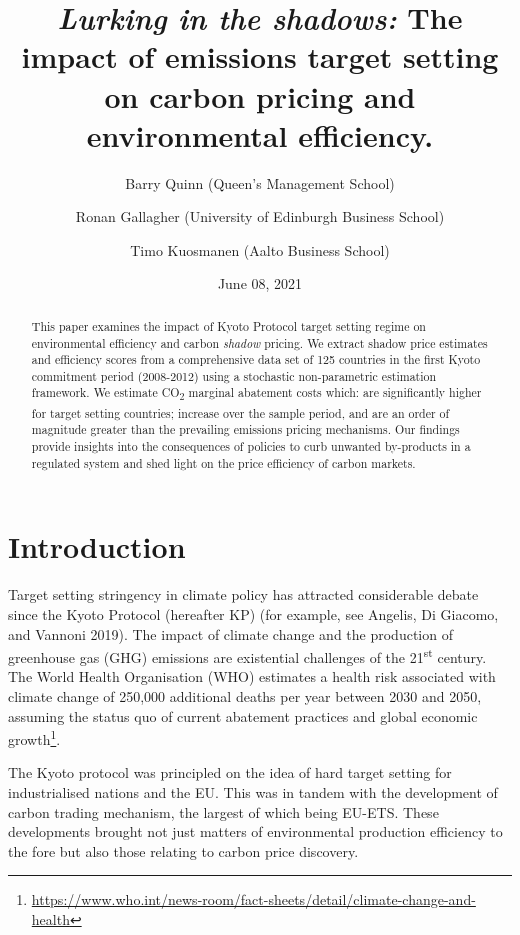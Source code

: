 \documentclass[
  10pt,
]{article}
\title{\emph{Lurking in the shadows:} The impact of emissions target setting on
carbon pricing and environmental efficiency.}
\author{Barry Quinn (Queen's Management School) \and Ronan Gallagher (University of Edinburgh Business School) \and Timo Kuosmanen (Aalto Business School)}
\date{June 08, 2021}
\begin{document}
\maketitle
\begin{abstract}
This paper examines the impact of Kyoto Protocol target setting
regime on environmental efficiency and carbon \emph{shadow} pricing. We
extract shadow price estimates and efficiency scores from a
comprehensive data set of 125 countries in the first Kyoto commitment period (2008-2012) using
a stochastic non-parametric estimation framework. We estimate CO\textsubscript{2}
marginal abatement costs which: are significantly higher for target setting countries; increase over the sample period, and are an order of magnitude greater
than the prevailing emissions pricing mechanisms. Our findings provide insights into the consequences of policies to curb unwanted by-products in a regulated
system and shed light on the price efficiency of carbon markets.
\end{abstract}

\hypertarget{introduction}{%
\section{Introduction}\label{introduction}}

Target setting stringency in climate policy has attracted considerable
debate since the Kyoto Protocol (hereafter KP) (for example, see
Angelis, Di Giacomo, and Vannoni 2019). The impact of climate change and
the production of greenhouse gas (GHG) emissions are existential
challenges of the 21\textsuperscript{st} century. The World Health
Organisation (WHO) estimates a health risk associated with climate change of
250,000 additional deaths per year between 2030 and 2050, assuming the
status quo of current abatement practices and global economic
growth\footnote{\url{https://www.who.int/news-room/fact-sheets/detail/climate-change-and-health}}.

The Kyoto protocol was principled on the idea of hard target setting for industrialised nations and the EU. This was in tandem with the development of carbon trading mechanism, the largest of which being EU-ETS. These developments brought not just matters of environmental production efficiency to the fore but also those relating to carbon price discovery.
\end{document}

